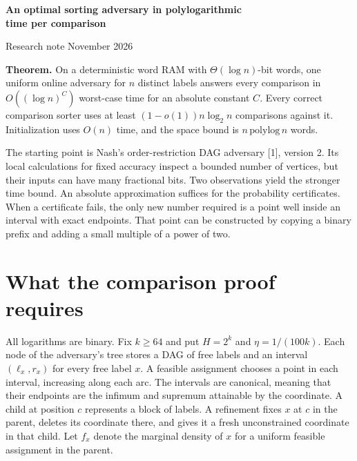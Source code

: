 \documentclass[11pt,a4paper]{article}
\begin{document}
\begin{center}
{\large\bfseries An optimal sorting adversary in polylogarithmic\\
time per comparison\par}
\vspace{6pt}
Research note November 2026
\end{center}
\vspace{6pt}

\textbf{Theorem.} On a deterministic word RAM with $\Theta(\log n)$-bit words,
one uniform online adversary for $n$ distinct labels answers every comparison in
$O((\log n)^C)$ worst-case time for an absolute constant $C$. Every correct
comparison sorter uses at least $(1-o(1))n\log_2 n$ comparisons against it.
Initialization uses $O(n)$ time, and the space bound is $n\,\mathrm{polylog}\,n$ words.

The starting point is Nash's order-restriction DAG adversary [1], version 2.
Its local calculations for fixed accuracy inspect a bounded number of vertices,
but their inputs can have many fractional bits. Two observations yield the
stronger time bound. An absolute approximation suffices for the probability
certificates. When a certificate fails, the only new number required is a point
well inside an interval with exact endpoints. That point can be constructed by
copying a binary prefix and adding a small multiple of a power of two.

\section{What the comparison proof requires}
All logarithms are binary. Fix $k\ge64$ and put $H=2^k$ and
$\eta=1/(100k)$. Each node of the adversary's tree stores a DAG of free labels
and an interval $(\ell_x,r_x)$ for every free label $x$. A feasible assignment
chooses a point in each interval, increasing along each arc. The intervals are
canonical, meaning that their endpoints are the infimum and supremum attainable
by the coordinate. A child at position $c$ represents a block of labels. A
refinement fixes $x$ at $c$ in the parent, deletes its coordinate there, and gives
it a fresh unconstrained coordinate in that child. Let $f_x$ denote the marginal
density of $x$ for a uniform feasible assignment in the parent.
\end{document}
